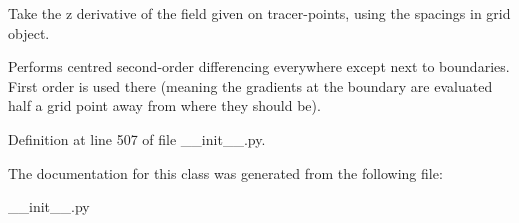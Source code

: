 Take the z derivative of the field given on tracer-\/points, using the spacings in grid object. 

Performs centred second-\/order differencing everywhere except next to boundaries. First order is used there (meaning the gradients at the boundary are evaluated half a grid point away from where they should be). 

Definition at line 507 of file \+\_\+\+\_\+init\+\_\+\+\_\+.\+py.



The documentation for this class was generated from the following file\+:\begin{DoxyCompactItemize}
\item 
\+\_\+\+\_\+init\+\_\+\+\_\+.\+py\end{DoxyCompactItemize}
